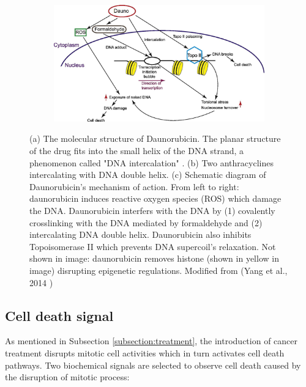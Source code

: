 \documentclass[pdftex,12pt,a4paper]{report}
\begin{document}
\begin{figure}[H]
\begin{subfigure}{.4\textwidth}
  \caption{}
  \label{fig:anthracyclines_dna}
\end{subfigure}
\centering
\begin{subfigure}{\textwidth}
  \centering
  \includegraphics[width=\textwidth]{images/daunorubicin_mechanism}
  \caption{}
  \label{fig:dauno_mechanism}
\end{subfigure}
\caption[The structure and mechanism of Daunorubicin]{(a) The molecular structure of Daunorubicin. The planar structure of the drug fits into the small helix of the DNA strand, a phenomenon called "DNA intercalation" \cite{leng1996base}. (b) Two anthracyclines intercalating with DNA double helix. (c) Schematic diagram of Daunorubicin's mechanism of action. From left to right: daunorubicin induces reactive oxygen species (ROS) which damage the DNA. Daunorubicin interfers with the DNA by (1) covalently crosslinking with the DNA mediated by formaldehyde and (2) intercalating DNA double helix. Daunorubicin also inhibits Topoisomerase II which prevents DNA supercoil's relaxation. Not shown in image: daunorubicin removes histone (shown in yellow in image) disrupting epigenetic regulations. Modified from (Yang et al., 2014 \cite{yang2014doxorubicin})}
\end{figure}

\subsection{Cell death signal}
\label{subsection:cell_death_signal}

As mentioned in Subsection \ref{subsection:treatment}, the introduction of cancer treatment disrupts mitotic cell activities which in turn activates cell death pathways. Two biochemical signals are selected to observe cell death caused by the disruption of mitotic process: %
\end{document}
